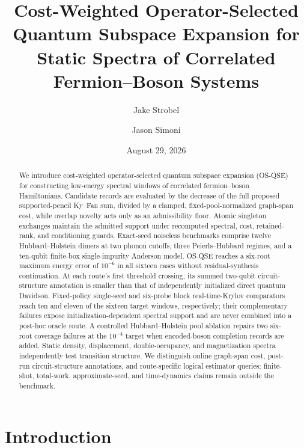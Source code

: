 \documentclass[
  reprint,
  amsmath,
  amssymb,
  aps,
  pra,
  nofootinbib,
  superscriptaddress,
  floatfix
]{revtex4-2}
\begin{document}
\title{Cost-Weighted Operator-Selected Quantum Subspace Expansion for Static Spectra of Correlated Fermion--Boson Systems}

\author{Jake Strobel}
\author{Jason Simoni}

\date{August 29, 2026}

\begin{abstract}
We introduce cost-weighted operator-selected quantum subspace expansion
(OS-QSE) for constructing low-energy spectral windows of correlated
fermion--boson Hamiltonians.  Candidate records are evaluated by the decrease
of the full proposed supported-pencil Ky--Fan sum, divided by a clamped,
fixed-pool-normalized graph-span cost, while overlap novelty acts only as an
admissibility floor.
Atomic singleton exchanges maintain the admitted support under recomputed
spectral, cost, retained-rank, and conditioning guards.  Exact-seed noiseless
benchmarks comprise twelve Hubbard--Holstein dimers at two phonon cutoffs,
three Peierls--Hubbard regimes, and a ten-qubit finite-box single-impurity
Anderson model.  OS-QSE reaches a six-root maximum energy error of $10^{-6}$
in all sixteen cases without residual-synthesis continuation.  At each
route's first threshold crossing, its summed two-qubit circuit-structure
annotation is smaller than that of independently initialized direct quantum
Davidson.  Fixed-policy single-seed and six-probe block real-time-Krylov
comparators reach ten and eleven of the sixteen target windows,
respectively; their complementary failures expose initialization-dependent
spectral support and are never combined into a post-hoc oracle route.  A
controlled Hubbard--Holstein pool ablation repairs two six-root coverage
failures at the $10^{-4}$ target when encoded-boson completion records are
added.  Static density,
displacement, double-occupancy, and magnetization spectra independently test
transition structure.  We distinguish online graph-span cost, post-run
circuit-structure annotations, and route-specific logical estimator queries;
finite-shot, total-work, approximate-seed, and time-dynamics claims remain
outside the benchmark.
\end{abstract}

\maketitle

\section{Introduction}
\label{sec:introduction}
\end{document}
